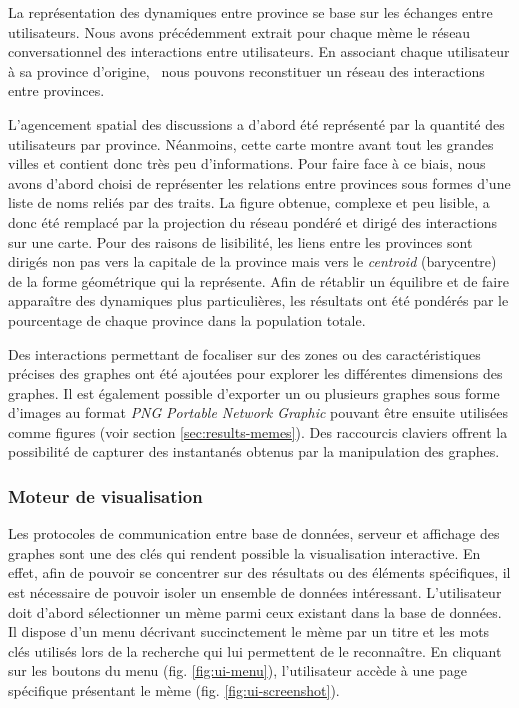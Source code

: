     La représentation des dynamiques entre province se base sur les échanges entre utilisateurs. Nous avons précédemment extrait pour chaque mème le réseau conversationnel des interactions entre utilisateurs. En associant chaque utilisateur à sa province d{\textquoteright}origine, \ nous pouvons reconstituer un réseau des interactions entre provinces. 

    L'agencement spatial des discussions a d'abord été représenté par la quantité des utilisateurs par province. Néanmoins, cette carte montre avant tout les grandes villes et contient donc très peu d'informations. Pour faire face à ce biais, nous avons d'abord choisi de représenter les relations entre provinces sous formes d'une liste de noms reliés par des traits. La figure obtenue, complexe et peu lisible, a donc été remplacé par la projection du réseau pondéré et dirigé des interactions sur une carte. Pour des raisons de lisibilité, les liens entre les provinces sont dirigés non pas vers la capitale de la province mais vers le \textit{centroid} (barycentre) de la forme géométrique qui la représente. Afin de rétablir un équilibre et de faire appara\^itre des dynamiques plus particuli\`eres, les résultats ont été pondérés par le pourcentage de chaque province dans la population totale.

    Des interactions permettant de focaliser sur des zones ou des caractéristiques précises des graphes ont été ajoutées pour explorer les différentes dimensions des graphes. Il est également possible d'exporter un ou plusieurs graphes sous forme d'images au format \textit{PNG} \textit{Portable Network Graphic} pouvant être ensuite utilisées comme figures (voir section \ref{sec:results-memes}). Des raccourcis claviers offrent la possibilité de capturer des instantanés obtenus par la manipulation des graphes.
    
\subsubsection{Moteur de visualisation} 
\label{sec:moteur_de_visualisation}

    Les protocoles de communication entre base de données, serveur et affichage des graphes sont une des clés qui rendent possible la visualisation interactive. En effet, afin de pouvoir se concentrer sur des résultats ou des éléments spécifiques, il est nécessaire de pouvoir isoler un ensemble de données intéressant. L'utilisateur doit d'abord sélectionner un mème parmi ceux existant dans la base de données. Il dispose d'un menu décrivant succinctement le mème par un titre et les mots clés utilisés lors de la recherche qui lui permettent de le reconnaître. En cliquant sur les boutons du menu (fig. \ref{fig:ui-menu}), l'utilisateur accède à une page spécifique présentant le mème (fig. \ref{fig:ui-screenshot}).

